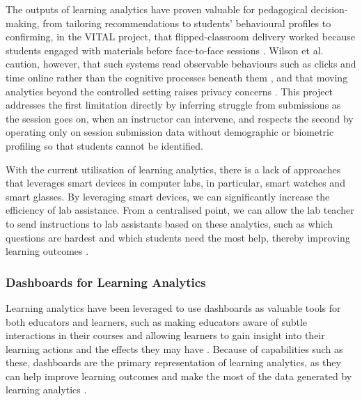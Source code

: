 The outputs of learning analytics have proven valuable for pedagogical decision-making, from tailoring recommendations to students' behavioural profiles \cite{vieira_2018_visual} to confirming, in the VITAL project, that flipped-classroom delivery worked because students engaged with materials before face-to-face sessions \cite{gelan_2018_affordances}. Wilson et al. caution, however, that such systems read observable behaviours such as clicks and time online rather than the cognitive processes beneath them \cite{wilson_2017_learning}, and that moving analytics beyond the controlled setting raises privacy concerns \cite{wilson_2017_learning,tzimas_2021_ethical}. 
This project addresses the first limitation directly by inferring struggle from submissions as the session goes on, when an instructor can intervene, and respects the second by operating only on session submission data without demographic or biometric profiling so that students cannot be identified.

With the current utilisation of learning analytics, there is a lack of approaches that leverages smart devices in computer labs, in particular, smart watches and smart glasses.
By leveraging smart devices, we can significantly increase the efficiency of lab assistance. 
From a centralised point, we can allow the lab teacher to send instructions to lab assistants based on these analytics, such as which questions are hardest and which students need the most help, thereby improving learning outcomes \cite{vieira_2018_visual,wilson_2017_learning,tzimas_2021_ethical}.

\subsubsection{Dashboards for Learning Analytics}

Learning analytics have been leveraged to use dashboards as valuable tools for both educators and learners, such as making educators aware of subtle interactions in their courses and allowing learners to gain insight into their learning actions and the effects they may have \cite{klerkx_2017_learning,verbert_2013_learning}. Because of capabilities such as these, dashboards are the primary representation of learning analytics, as they can help improve learning outcomes and make the most of the data generated by learning analytics \cite{klerkx_2017_learning,verbert_2013_learning}.

